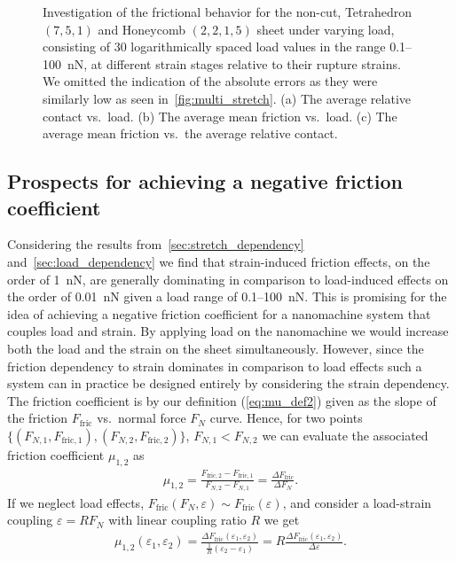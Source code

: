 \begin{figure}[H]
\begin{subfigure}[t]{0.8\textwidth}
      \caption{}
     \label{fig:multi_FN_fric_vs_contact}
  \end{subfigure}
  \hfill
     \caption{Investigation of the frictional behavior for the non-cut, Tetrahedron $(7,5,1)$ and Honeycomb $(2,2,1,5)$ sheet under varying load, consisting of 30 logarithmically spaced load values in the range 0.1--\SI{100}{nN}, at different strain stages relative to their rupture strains. We omitted the indication of the absolute errors as they were similarly low as seen in~\cref{fig:multi_stretch}. (a) The average relative contact vs.\ load. (b) The average mean friction vs.\ load. (c) The average mean friction vs.\ the average relative contact.}
     \label{fig:multi_load}
\end{figure}

\subsection{Prospects for achieving a negative friction coefficient}\label{sec:neg_prospects}
Considering the results from~\cref{sec:stretch_dependency}
and~\cref{sec:load_dependency} we find that strain-induced friction effects, on
the order of \SI{1}{nN}, are generally dominating in comparison to load-induced
effects on the order of \SI{0.01}{nN} given a load range of 0.1--\SI{100}{nN}.
This is promising for the idea of achieving a negative friction coefficient for
a nanomachine system that couples load and strain. By applying load on the
nanomachine we would increase both the load and the strain on the sheet
simultaneously. However, since the friction dependency to strain dominates in
comparison to load effects such a system can in practice be designed entirely by
considering the strain dependency. The friction coefficient is by our definition
(\cref{eq:mu_def2}) given as the slope of the friction $F_{\text{fric}}$ vs.\ normal force
$F_N$ curve. Hence, for two points $\{(F_{N,1}, F_{\text{fric},1}), (F_{N,2}, F_{\text{fric},2})\}$,
$F_{N,1} < F_{N,2}$ we can evaluate the associated friction coefficient
$\mu_{1,2}$ as 
\begin{align*}
  \mu_{1,2} = \frac{F_{\text{fric},2} - F_{\text{fric},1}}{F_{N,2} - F_{N,1}} = \frac{\Delta F_{\text{fric}}}{\Delta F_N}.
\end{align*}
If we neglect load effects, $F_{\text{fric}}(F_N, \varepsilon) \sim F_{\text{fric}}(\varepsilon)$, and consider a load-strain coupling $\varepsilon = R F_N$ with linear coupling ratio $R$ we get 
\begin{align}
  \mu_{1,2}(\varepsilon_1, \varepsilon_2) = \frac{\Delta F_{\text{fric}}(\varepsilon_1, \varepsilon_2)}{\frac{1}{R}(\varepsilon_2 - \varepsilon_1)} = R\frac{\Delta F_{\text{fric}}(\varepsilon_1, \varepsilon_2)}{\Delta \varepsilon}.
  \label{eq:mu_strain}
\end{align}
